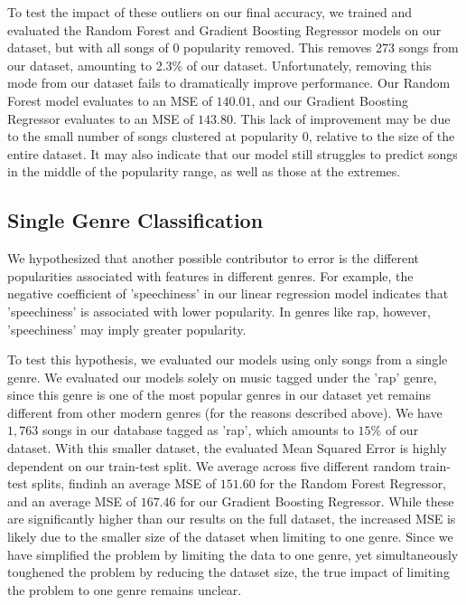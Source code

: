 \documentclass[journal]{IEEEtran}
\begin{document}
To test the impact of these outliers on our final accuracy, we trained and evaluated the Random Forest and Gradient Boosting Regressor models on our dataset, but with all songs of 0 popularity removed. This removes 273 songs from our dataset, amounting to 2.3\% of our dataset. Unfortunately, removing this mode from our dataset fails to dramatically improve performance. Our Random Forest model evaluates to an MSE of $140.01$, and our Gradient Boosting Regressor evaluates to an MSE of $143.80$. This lack of improvement may be due to the small number of songs clustered at popularity 0, relative to the size of the entire dataset. It may also indicate that our model still struggles to predict songs in the middle of the popularity range, as well as those at the extremes.

\subsection{Single Genre Classification}
We hypothesized that another possible contributor to error is the different popularities associated with features in different genres. For example, the negative coefficient of 'speechiness' in our linear regression model indicates that 'speechiness' is associated with lower popularity. In genres like rap, however, 'speechiness' may imply greater popularity.

To test this hypothesis, we evaluated our models using only songs from a single genre. We evaluated our models solely on music tagged under the 'rap' genre, since this genre is one of the most popular genres in our dataset yet remains different from other modern genres (for the reasons described above). We have $1,763$ songs in our database tagged as 'rap', which amounts to $15\%$ of our dataset. With this smaller dataset, the evaluated Mean Squared Error is highly dependent on our train-test split. We average across five different random train-test splits, findinh an average MSE of $151.60$ for the Random Forest Regressor, and an average MSE of $167.46$ for our Gradient Boosting Regressor. While these are significantly higher than our results on the full dataset, the increased MSE is likely due to the smaller size of the dataset when limiting to one genre. Since we have simplified the problem by limiting the data to one genre, yet simultaneously toughened the problem by reducing the dataset size, the true impact of limiting the problem to one genre remains unclear.

\subsection{}
\end{document}
